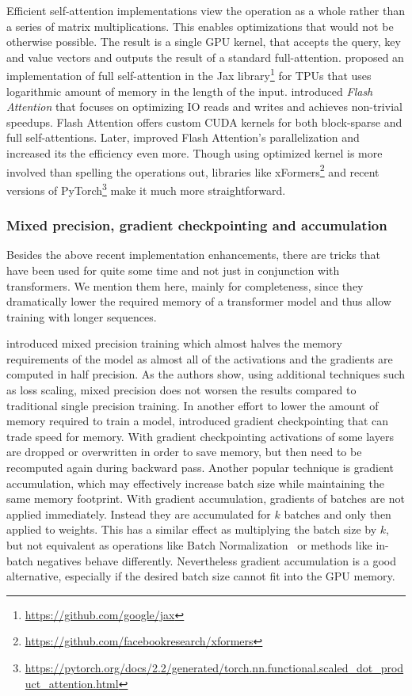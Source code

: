 Efficient self-attention implementations view the operation as a whole rather
than a series of matrix multiplications. This enables optimizations that would
not be otherwise possible. The result is a single GPU kernel, that accepts the
query, key and value vectors and outputs the result of a standard
full-attention. \cite{rabe2021self} proposed an implementation of full
self-attention in the Jax
library\footnote{\url{https://github.com/google/jax}} for TPUs that uses
logarithmic amount of memory in the length of the input.
\cite{dao2022flashattention} introduced \emph{Flash Attention} that focuses on
optimizing IO reads and writes and achieves non-trivial speedups. Flash
Attention offers custom CUDA kernels for both block-sparse and full
self-attentions. Later, \cite{dao2023flashattention} improved Flash Attention's
parallelization and increased its the efficiency even more. Though using
optimized kernel is more involved than spelling the operations out, libraries
like xFormers\footnote{\url{https://github.com/facebookresearch/xformers}} and
recent versions of
PyTorch\footnote{\url{https://pytorch.org/docs/2.2/generated/torch.nn.functional.scaled_dot_product_attention.html}}
make it much more straightforward.

\subsubsection{Mixed precision, gradient checkpointing and accumulation}

Besides the above recent implementation enhancements, there are tricks that
have been used for quite some time and not just in conjunction with
transformers. We mention them here, mainly for completeness, since they
dramatically lower the required memory of a transformer model and thus allow
training with longer sequences.

\cite{micikevicius2017mixed} introduced mixed precision training which almost
halves the memory requirements of the model as almost all of the activations
and the gradients are computed in half precision. As the authors show, using
additional techniques such as loss scaling, mixed precision does not worsen the
results compared to traditional single precision training. In another effort to
lower the amount of memory required to train a model, \cite{chen2016training}
introduced gradient checkpointing that can trade speed for memory. With
gradient checkpointing activations of some layers are dropped or overwritten in
order to save memory, but then need to be recomputed again during backward
pass. Another popular technique is gradient accumulation, which may effectively
increase batch size while maintaining the same memory footprint. With gradient
accumulation, gradients of batches are not applied immediately. Instead they
are accumulated for $k$ batches and only then applied to weights. This has a
similar effect as multiplying the batch size by $k$, but not equivalent as
operations like Batch Normalization~\cite{ioffe2015batch} or methods like
in-batch negatives behave differently. Nevertheless gradient accumulation is a
good alternative, especially if the desired batch size cannot fit into the GPU
memory.

